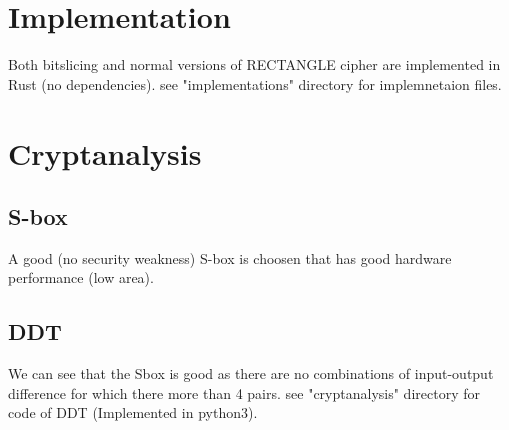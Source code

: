 \documentclass[final]{transcrypto}
\begin{document}
\section{Implementation}
Both bitslicing and normal versions of RECTANGLE cipher are implemented in Rust (no dependencies).
see "implementations" directory for implemnetaion files.
\section{Cryptanalysis}
\subsection{S-box}
A good (no security weakness) S-box is choosen that has good hardware performance (low area).
\subsection{DDT}
We can see that the Sbox is good as there are no combinations of input-output difference for which there more than 4 pairs.
see "cryptanalysis" directory for code of DDT (Implemented in python3).
\end{document}

